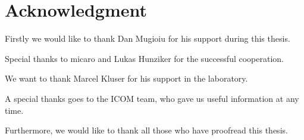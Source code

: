 \section*{Acknowledgment}

Firstly we would like to thank Dan Mugioiu for his support during this thesis.

Special thanks to micaro and Lukas Hunziker for the successful cooperation.

We want to thank Marcel Kluser for his support in the laboratory.

A special thanks goes to the ICOM team, who gave us useful information at any time.

Furthermore, we would like to thank all those who have proofread this thesis.
